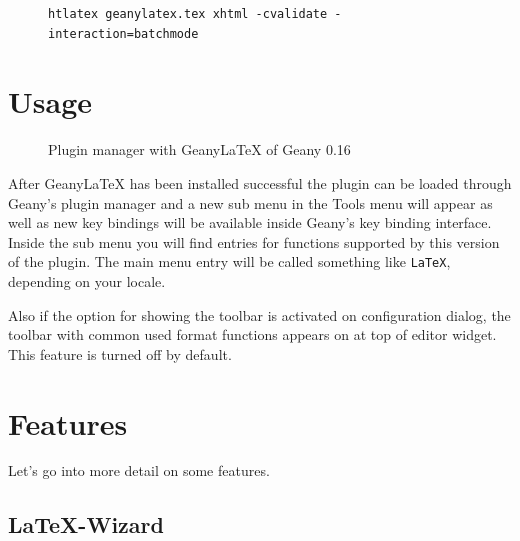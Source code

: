 \documentclass[%
a4paper,%
10pt,%
oneside,%
DIV18,
headsepline,
plainheadsepline,
footsepline,
plainfootsepline,
bibtotoc,%
liststotoc,%
BCOR12mm,%
halfparskip,%
openany,%
]{scrartcl}
\begin{document}
\begin{figure}[h!]
\begin{lstlisting}
htlatex geanylatex.tex xhtml -cvalidate -interaction=batchmode
\end{lstlisting}
\end{figure}

\section{Usage}
\begin{figure}[h!]
	\caption{Plugin manager with Geany\LaTeX{} of Geany 0.16}
\end{figure}

After Geany\LaTeX{} has been installed successful the plugin can be
loaded through Geany's plugin manager and a new sub menu in the Tools
menu will appear as well as new key bindings will be available inside
Geany's key binding interface. Inside the sub menu you will find entries
for functions supported by this version of the plugin. The main menu entry
will be called something like \texttt{LaTeX}, depending on your locale.

Also if the option for showing the toolbar is activated on configuration
dialog, the toolbar with common used format functions appears on at top
of editor widget. This feature is turned off by default.


\section{Features}

Let's go into more detail on some features.

\subsection{\LaTeX-Wizard}
\end{document}
